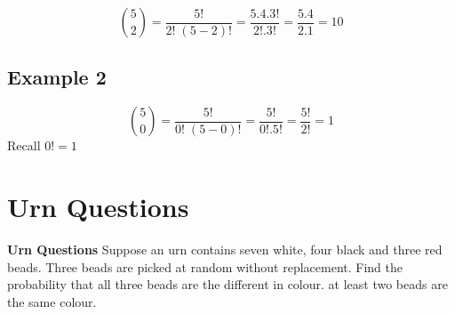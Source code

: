 \documentclass[12pt]{report}
\begin{document}
\[ \binom 5 2  = \frac{5!}{2!\;(5-2)!} = \frac{5.4.3!}{2! .3!} = \frac{5.4}{2.1} = 10\]

\subsection*{Example 2}

\[ \binom 5 0   = \frac{5!}{0!\;(5-0)!} = \frac{5!}{0! .5!} = \frac{5!}{2!} = 1\]
Recall $0! =1$
\section{Urn Questions}	

\bigskip 
\textbf{Urn Questions}
Suppose an urn contains seven white, four black and three red beads. Three beads are picked at random without replacement.
Find the probability that all three beads are the different in colour.
at least two beads are the same colour.
\end{document}
